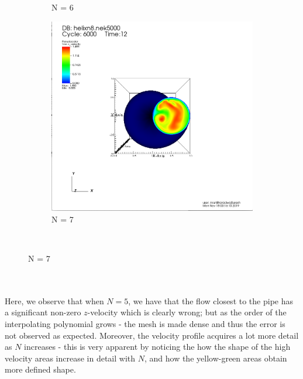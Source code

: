 \documentclass[12pt]{article}
\begin{document}
\begin{figure}[h]
\begin{subfigure}[h]{0.400\textwidth}
		\caption{N = 6}
	\end{subfigure}
	\begin{subfigure}[h]{0.400\textwidth}
		\centering
		\includegraphics[width=\textwidth]{z8c6000.png}
		\caption{N = 7}
	\end{subfigure}\\ 
\end{figure}\\\\
Here, we observe that when $N=5$, we have that the flow closest to the pipe has a significant non-zero $z$-velocity which is clearly wrong; but as the order of the interpolating polynomial grows - the mesh is made dense and thus the error is not observed as expected. Moreover, the velocity profile acquires a lot more detail as $N$ increases - this is very apparent by noticing the how the shape of the high velocity areas increase in detail with $N$, and how the yellow-green areas obtain more defined shape. \\
\end{document}
